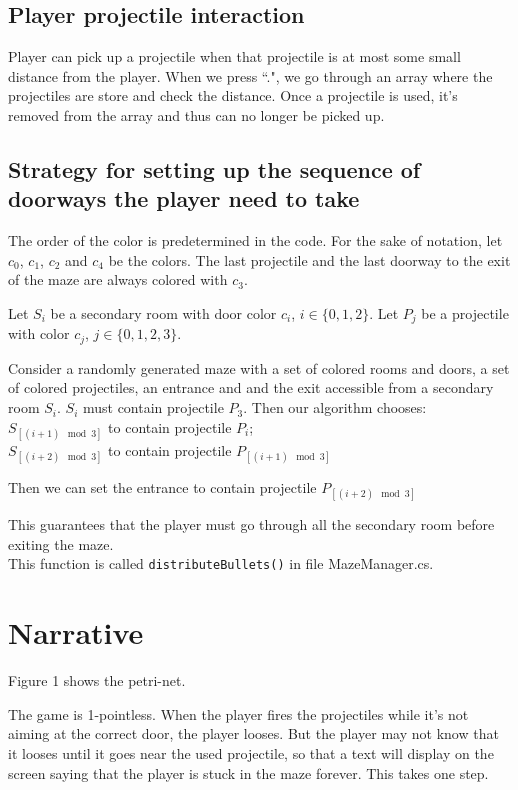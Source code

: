 \documentclass[13pt]{article}
\begin{document}
\subsection{Player projectile interaction}
Player can pick up a projectile when that projectile is at most some small distance from the player. When we press ``.", we go through an array where the projectiles are store and check the distance. Once a projectile is used, it's removed from the array and thus can no longer be picked up. 

\subsection{Strategy for setting up the sequence of doorways the player need to take}
The order of the color is predetermined in the code. For the sake of notation, let $c_0$, $c_1$, $c_2$ and $c_4$ be the colors. The last projectile and the last doorway to the exit of the maze are always colored with $c_3$. 

Let $S_i$ be a secondary room with door color $c_i$, $i\in \{0,1,2\}$. Let $P_j$ be a projectile with color $c_j$, $j\in \{0,1,2,3\}$. 

Consider a randomly generated maze with a set of colored rooms and doors, a set of colored projectiles, an entrance and and the exit accessible from a secondary room $S_i$. $S_i$ must contain projectile $P_3$. Then our algorithm chooses:\\
$S_{[(i+1)\mod 3]}$ to contain projectile $P_i$;\\
$S_{[(i+2)\mod 3]}$ to contain projectile $P_{[(i+1)\mod 3]}$

Then we can set the entrance to contain projectile $P_{[(i+2)\mod 3]}$

This guarantees that the player must go through all the secondary room before exiting the maze. \\

This function is called \texttt{distributeBullets()} in file MazeManager.cs.

\section{Narrative}
Figure 1 shows the petri-net. 

The game is 1-pointless. When the player fires the projectiles while it's not aiming at the correct door, the player looses. But the player may not know that it looses until it goes near the used projectile, so that a text will display on the screen saying that the player is stuck in the maze forever. This takes one step.
\end{document}
